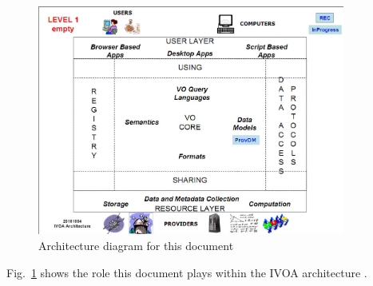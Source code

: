 \documentclass[11pt,a4paper]{ivoa}
\begin{document}
\begin{figure}
\centering


\includegraphics[width=0.9\textwidth]{archdiag.png}
\caption{Architecture diagram for this document}
\label{fig:archdiag}
\end{figure}

Fig.~\ref{fig:archdiag} shows the role this document plays within the
IVOA architecture \citep{note:VOARCH}.
\end{document}

